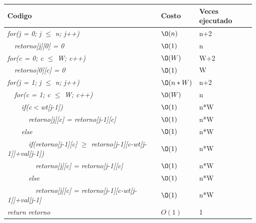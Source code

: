 \documentclass[spanish]{article}
\begin{document}
 		\begin{center}
 			\begin{table}[H]
 				\begin{tabular}{|l|l|l|}
 					\hline
 					\rowcolor[HTML]{FFCC67} 
 					Codigo                           & Costo & Veces ejecutado \\ \hline
 					\textit{for(j = 0; j $\leq$ n; j++)}                    & $\O(n)$    & n+2               \\ \hline
 					\textit{\  \  retorno[j][0] = 0}                    & $\O(1)$    & n               \\ \hline
 					\textit{for(c = 0; c $\leq$ W; c++)}                    & $\O(W)$    & W+2               \\ \hline
 					\textit{\  \  retorno[0][c] = 0}                    & $\O(1)$    & W               \\ \hline
 					\textit{for(j = 1; j $\leq$ n; j++)}                    & $\O(n*W)$    & n+2               \\ \hline 					
 					\textit{\  \  for(c = 1; c $\leq$ W; c++)}                    & $\O(W)$    & n               \\ \hline 
 					\textit{\  \  \  \  if(c$<$wt[j-1])}                    & $\O(1)$    & n*W               \\ \hline 
 					\textit{\  \  \  \  \  \  retorno[j][c] = retorno[j-1][c]}                    & $\O(1)$    & n*W               \\ \hline 
 					\textit{\  \  \  \  else}                    & $\O(1)$    & n*W               \\ \hline 
 					\textit{\  \  \  \  \  \  if(retorno[j-1][c] $\geq$ retorno[j-1][c-wt[j-1]]+val[j-1])}                    & $\O(1)$    & n*W               \\ \hline
 						\textit{\  \  \  \  \  \  \  \  retorno[j][c] = retorno[j-1][c]}                    & $\O(1)$    & n*W               \\ \hline	
 							\textit{\  \  \  \  \  \  else}                    & $\O(1)$    & n*W               \\ \hline
 								\textit{\  \  \  \  \  \  \  \  retorno[j][c] = retorno[j-1][c-wt[j-1]]+val[j-1]}                    & $\O(1)$    & n*W               \\ \hline							
 					\textit{return retorno}                    & $O(1)$    & 1               \\ \hline 				
 				\end{tabular}
 			\end{table}										
 		\end{center}
\end{document}
